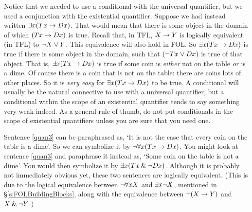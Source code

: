 Notice that we needed to use a conditional with the universal quantifier, but we used a conjunction with the existential quantifier. Suppose we had instead written $\exists x(Tx \rightarrow Dx)$. That would mean that there is some object in the domain of which $(Tx \rightarrow Dx)$ is true. Recall that, in TFL, $X \rightarrow Y$ is logically equivalent (in TFL) to $\neg X \vee Y$. This equivalence will also hold in FOL. So $\exists x(Tx \rightarrow Dx)$ is true if there is some object in the domain, such that $(\neg Tx \vee Dx)$ is true of that object. That is, $\exists x (Tx \rightarrow Dx)$ is true if some coin is \emph{either} not on the table \emph{or} is a dime. Of course there is a coin that is not on the table: there are coins lots of other places. So it is \emph{very easy} for $\exists x(Tx \rightarrow Dx)$ to be true. A conditional will usually be the natural connective to use with a universal quantifier, but a conditional within the scope of an existential quantifier tends to say something very weak indeed. As a general rule of thumb, do not put conditionals in the scope of existential quantifiers unless you are sure that you need one.
	
Sentence \ref{quan3} can be paraphrased as, `It is not the case that every coin on the table is a dime'. So we can symbolize it by $\neg \forall x(Tx \rightarrow Dx)$. You might look at sentence \ref{quan3} and paraphrase it instead as, `Some coin on the table is not a dime'. You would then symbolize it by $\exists x(Tx \mathbin{\&} \neg Dx)$. Although it is probably not immediately obvious yet, these two sentences are logically equivalent. (This is due to the logical equivalence between $\neg\forall xX$ and $\exists x\neg X$, mentioned in \S\ref{s:FOLBuildingBlocks}, along with the equivalence between $\neg(X\rightarrow Y)$ and $X\mathbin{\&}\neg Y$.)

